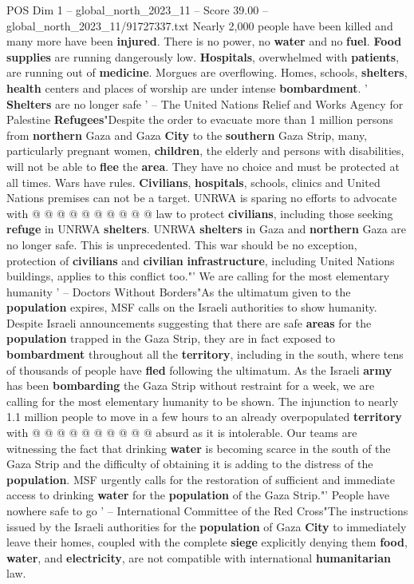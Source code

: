 \begin{textsample}{POS Dim 1 – global\_north\_2023\_11 – Score 39.00 – global\_north\_2023\_11/91727337.txt}
Nearly 2,000 people have been killed and many more have been \textbf{injured}.
There is no power, no \textbf{water} and no \textbf{fuel}. \textbf{Food} \textbf{supplies} are running dangerously low. \textbf{Hospitals}, overwhelmed with \textbf{patients}, are running out of \textbf{medicine}.
Morgues are overflowing.
Homes, schools, \textbf{shelters}, \textbf{health} centers and places of worship are under intense \textbf{bombardment}. ' \textbf{Shelters} are no longer safe ' -- The United Nations Relief and Works Agency for Palestine \textbf{Refugees}"Despite the order to evacuate more than 1 million persons from \textbf{northern} Gaza and Gaza \textbf{City} to the \textbf{southern} Gaza Strip, many, particularly pregnant women, \textbf{children}, the elderly and persons with disabilities, will not be able to \textbf{flee} the \textbf{area}.
They have no choice and must be protected at all times.
Wars have rules. \textbf{Civilians}, \textbf{hospitals}, schools, clinics and United Nations premises can not be a target.
UNRWA is sparing no efforts to advocate with @ @ @ @ @ @ @ @ @ @ law to protect \textbf{civilians}, including those seeking \textbf{refuge} in UNRWA \textbf{shelters}.
UNRWA \textbf{shelters} in Gaza and \textbf{northern} Gaza are no longer safe.
This is unprecedented.
This war should be no exception, protection of \textbf{civilians} and \textbf{civilian} \textbf{infrastructure}, including United Nations buildings, applies to this conflict too."' We are calling for the most elementary humanity ' -- Doctors Without Borders"As the ultimatum given to the \textbf{population} expires, MSF calls on the Israeli authorities to show humanity.
Despite Israeli announcements suggesting that there are safe \textbf{areas} for the \textbf{population} trapped in the Gaza Strip, they are in fact exposed to \textbf{bombardment} throughout all the \textbf{territory}, including in the south, where tens of thousands of people have \textbf{fled} following the ultimatum.
As the Israeli \textbf{army} has been \textbf{bombarding} the Gaza Strip without restraint for a week, we are calling for the most elementary humanity to be shown.
The injunction to nearly 1.1 million people to move in a few hours to an already overpopulated \textbf{territory} with @ @ @ @ @ @ @ @ @ @ absurd as it is intolerable.
Our teams are witnessing the fact that drinking \textbf{water} is becoming scarce in the south of the Gaza Strip and the difficulty of obtaining it is adding to the distress of the \textbf{population}.
MSF urgently calls for the restoration of sufficient and immediate access to drinking \textbf{water} for the \textbf{population} of the Gaza Strip."' People have nowhere safe to go ' -- International Committee of the Red Cross"The instructions issued by the Israeli authorities for the \textbf{population} of Gaza \textbf{City} to immediately leave their homes, coupled with the complete \textbf{siege} explicitly denying them \textbf{food}, \textbf{water}, and \textbf{electricity}, are not compatible with international \textbf{humanitarian} law.

\end{textsample}
